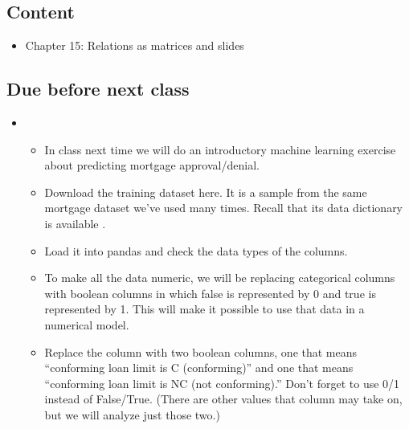 \documentclass[letterpaper,10pt,english]{jupyterBook}
\begin{document}
\subsection{Content}
\label{\detokenize{course-schedule:id19}}\begin{itemize}
\item {} 
\sphinxAtStartPar
Chapter 15: Relations as matrices \sphinxhyphen{} {\hyperref[\detokenize{chapter-16-matrices::doc}]{}} and slides

\end{itemize}


\subsection{Due before next class}
\label{\detokenize{course-schedule:id20}}\begin{itemize}
\item {} 
\sphinxAtStartPar
{}
\begin{itemize}
\item {} 
\sphinxAtStartPar
In class next time we will do an introductory machine learning exercise about predicting mortgage approval/denial.

\item {} 
\sphinxAtStartPar
Download the training dataset here.  It is a sample from the same mortgage dataset we’ve used many times.  Recall that its data dictionary is available .

\item {} 
\sphinxAtStartPar
Load it into pandas and check the data types of the columns.

\item {} 
\sphinxAtStartPar
To make all the data numeric, we will be replacing categorical columns with boolean columns in which false is represented by 0 and true is represented by 1.  This will make it possible to use that data in a numerical model.

\item {} 
\sphinxAtStartPar
Replace the  column with two boolean columns, one that means “conforming loan limit is C (conforming)” and one that means “conforming loan limit is NC (not conforming).”  Don’t forget to use 0/1 instead of False/True.  (There are other values that column may take on, but we will analyze just those two.)


\end{itemize}
\end{itemize}
\end{document}
